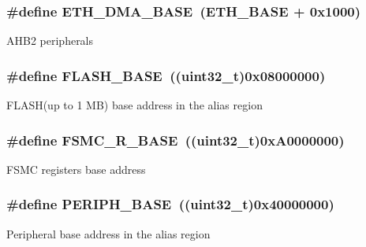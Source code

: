 \subsubsection[{\texorpdfstring{E\+T\+H\+\_\+\+D\+M\+A\+\_\+\+B\+A\+SE}{ETH_DMA_BASE}}]{\setlength{\rightskip}{0pt plus 5cm}\#define E\+T\+H\+\_\+\+D\+M\+A\+\_\+\+B\+A\+SE~(E\+T\+H\+\_\+\+B\+A\+SE + 0x1000)}\hypertarget{group___peripheral__memory__map_gace2114e1b37c1ba88d60f3e831b67e93}{}\label{group___peripheral__memory__map_gace2114e1b37c1ba88d60f3e831b67e93}
A\+H\+B2 peripherals 
\subsubsection[{\texorpdfstring{F\+L\+A\+S\+H\+\_\+\+B\+A\+SE}{FLASH_BASE}}]{\setlength{\rightskip}{0pt plus 5cm}\#define F\+L\+A\+S\+H\+\_\+\+B\+A\+SE~((uint32\+\_\+t)0x08000000)}\hypertarget{group___peripheral__memory__map_ga23a9099a5f8fc9c6e253c0eecb2be8db}{}\label{group___peripheral__memory__map_ga23a9099a5f8fc9c6e253c0eecb2be8db}
F\+L\+A\+S\+H(up to 1 M\+B) base address in the alias region 
\subsubsection[{\texorpdfstring{F\+S\+M\+C\+\_\+\+R\+\_\+\+B\+A\+SE}{FSMC_R_BASE}}]{\setlength{\rightskip}{0pt plus 5cm}\#define F\+S\+M\+C\+\_\+\+R\+\_\+\+B\+A\+SE~((uint32\+\_\+t)0x\+A0000000)}\hypertarget{group___peripheral__memory__map_gaddf0e199dccba83272b20c9fb4d3aaed}{}\label{group___peripheral__memory__map_gaddf0e199dccba83272b20c9fb4d3aaed}
F\+S\+MC registers base address 
\subsubsection[{\texorpdfstring{P\+E\+R\+I\+P\+H\+\_\+\+B\+A\+SE}{PERIPH_BASE}}]{\setlength{\rightskip}{0pt plus 5cm}\#define P\+E\+R\+I\+P\+H\+\_\+\+B\+A\+SE~((uint32\+\_\+t)0x40000000)}\hypertarget{group___peripheral__memory__map_ga9171f49478fa86d932f89e78e73b88b0}{}\label{group___peripheral__memory__map_ga9171f49478fa86d932f89e78e73b88b0}
Peripheral base address in the alias region 

